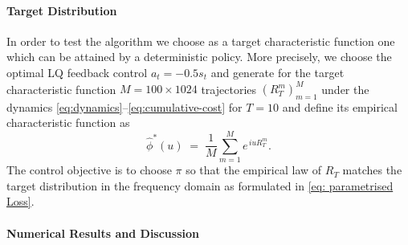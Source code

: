 \documentclass[reqno, 11pt]{amsart}%
\theoremstyle{definition}
\begin{document}
\paragraph{Target Distribution}
In order to test the algorithm we choose as a target characteristic function one which can be attained by a deterministic policy. More precisely, we choose the optimal LQ feedback control $a_t= -0.5 s_t$ and generate for the target characteristic function $M=100\times 1024$ trajectories \((R_T^{m})_{m=1}^M\) under the dynamics
\eqref{eq:dynamics}--\eqref{eq:cumulative-cost} for $T=10$ and define its empirical characteristic function as
\begin{equation}\label{eq:empirical-policy}
  \widehat{\phi}^*(u)
  \;=\;
  \frac{1}{M}\sum_{m=1}^{M}
  e^{\,iu R_T^{m}} .
\end{equation}
The control objective is to choose \(\pi\) so that the empirical law of \(R_T\) matches the target distribution in the frequency domain as formulated in \eqref{eq: parametrised Loss}.

\paragraph{Numerical Results and Discussion}

\end{document}
